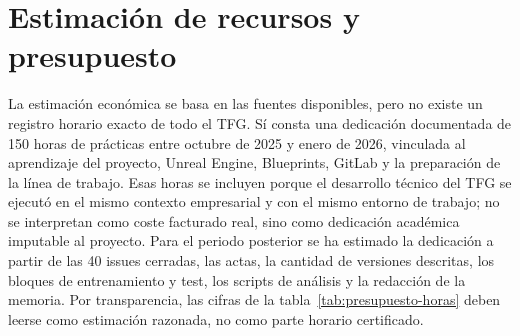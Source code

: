 \section{Estimación de recursos y presupuesto}

La estimación económica se basa en las fuentes disponibles, pero no existe un registro horario exacto de todo el TFG. Sí consta una dedicación documentada de 150 horas de prácticas entre octubre de 2025 y enero de 2026, vinculada al aprendizaje del proyecto, Unreal Engine, Blueprints, GitLab y la preparación de la línea de trabajo. Esas horas se incluyen porque el desarrollo técnico del TFG se ejecutó en el mismo contexto empresarial y con el mismo entorno de trabajo; no se interpretan como coste facturado real, sino como dedicación académica imputable al proyecto. Para el periodo posterior se ha estimado la dedicación a partir de las 40 issues cerradas, las actas, la cantidad de versiones descritas, los bloques de entrenamiento y test, los scripts de análisis y la redacción de la memoria. Por transparencia, las cifras de la tabla~\ref{tab:presupuesto-horas} deben leerse como estimación razonada, no como parte horario certificado.

